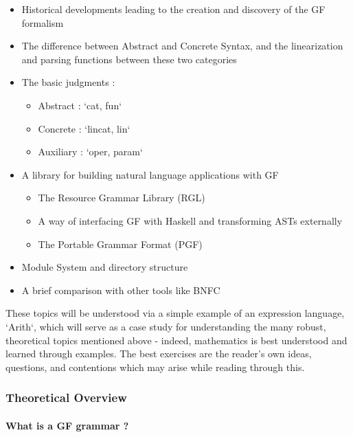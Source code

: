 \documentclass[11pt, a4paper]{article}
\begin{document}
\begin{itemize}[noitemsep]

\item Historical developments leading to the creation and discovery of the GF
formalism
\item The difference between Abstract and Concrete Syntax, and the linearization
and parsing functions between these two categories
\item The basic judgments :
  \begin{itemize}[noitemsep]
    \item Abstract : `cat, fun`
    \item Concrete : `lincat, lin`
    \item Auxiliary : `oper, param`
  \end{itemize}
\item A library for building natural language applications with GF
  \begin{itemize}[noitemsep]
    \item The Resource Grammar Library (RGL)
    \item A way of interfacing GF with Haskell and transforming ASTs externally
    \item The Portable Grammar Format (PGF)
\end{itemize}
\item Module System and directory structure
\item A brief comparison with other tools like BNFC

\end{itemize}

These topics will be understood via a simple example of an expression language,
`Arith`, which will serve as a case study for understanding the many robust,
theoretical topics mentioned above - indeed, mathematics is best understood and
learned through examples. The best exercises are the reader's own ideas,
questions, and contentions which may arise while reading through this.

\subsubsection{Theoretical Overview}

\paragraph { What is a GF grammar ? }
\end{document}
